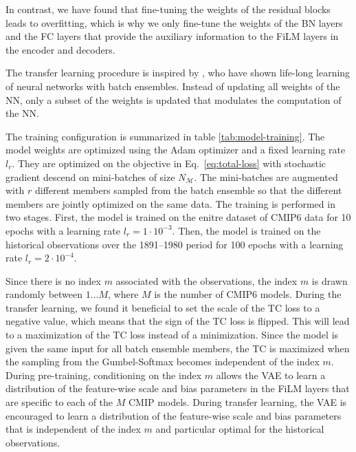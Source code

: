 \documentclass[english,a4paper,10pt]{scrartcl}
\begin{document}
In contrast, we have found that fine-tuning the weights of the residual blocks leads to overfitting, which is why we only fine-tune the weights of the BN layers and the FC layers that provide the auxiliary information to the FiLM layers in the encoder and decoders.

The transfer learning procedure is inspired by \cite{Wen.Tran.ea.2020}, who have shown life-long learning of neural networks with batch ensembles. Instead of updating all weights of the NN, only a subset of the weights is updated that modulates the computation of the NN.

The training configuration is summarized in table \ref{tab:model-training}. The model weights are optimized using the Adam optimizer \citep{Kingma.Ba.2014} and a fixed learning rate $l_r$. They are optimized on the objective in Eq.~\eqref{eq:total-loss} with stochastic gradient descend on mini-batches of size $N_{\mathcal{M}}$. The mini-batches are augmented with $r$ different members sampled from the batch ensemble so that the different members are jointly optimized on the same data. The training is performed in two stages. First, the model is trained on the enitre dataset of CMIP6 data for 10 epochs with a learning rate $l_r=1 \cdot 10^{-3}$. Then, the model is trained on the historical observations over the 1891--1980 period for 100 epochs with a learning rate $l_r=2 \cdot 10^{-4}$.

Since there is no index $m$ associated with the observations, the index $m$ is drawn randomly between $1\dots M$, where $M$ is the number of CMIP6 models. During the transfer learning, we found it beneficial to set the scale of the TC loss to a negative value, which means that the sign of the TC loss is flipped. This will lead to a maximization of the TC loss instead of a minimization. Since the model is given the same input for all batch ensemble members, the TC is maximized when the sampling from the Gumbel-Softmax becomes independent of the index $m$. During pre-training, conditioning on the index $m$ allows the VAE to learn a distribution of the feature-wise scale and bias parameters in the FiLM layers that are specific to each of the $M$ CMIP models. During transfer learning, the VAE is encouraged to learn a distribution of the feature-wise scale and bias parameters that is independent of the index $m$ and particular optimal for the historical observations.
\end{document}
